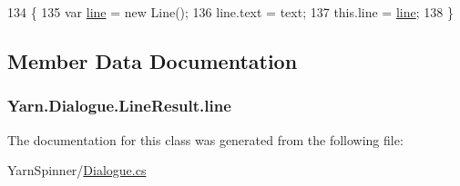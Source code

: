 \begin{DoxyCode}
134                                             \{
135                 var \hyperlink{a00106_abfbb0ea840b02acd0ecdc72c5b120257}{line} = \textcolor{keyword}{new} Line();
136                 line.text = text;
137                 this.line = \hyperlink{a00106_abfbb0ea840b02acd0ecdc72c5b120257}{line};
138             \}
\end{DoxyCode}


\subsection{Member Data Documentation}
\hypertarget{a00106_abfbb0ea840b02acd0ecdc72c5b120257}{
\subsubsection[{line}]{ Yarn.\-Dialogue.\-Line\-Result.\-line}}\label{a00106_abfbb0ea840b02acd0ecdc72c5b120257}


The documentation for this class was generated from the following file\-:\begin{DoxyCompactItemize}
\item 
Yarn\-Spinner/\hyperlink{a00265}{Dialogue.\-cs}\end{DoxyCompactItemize}
